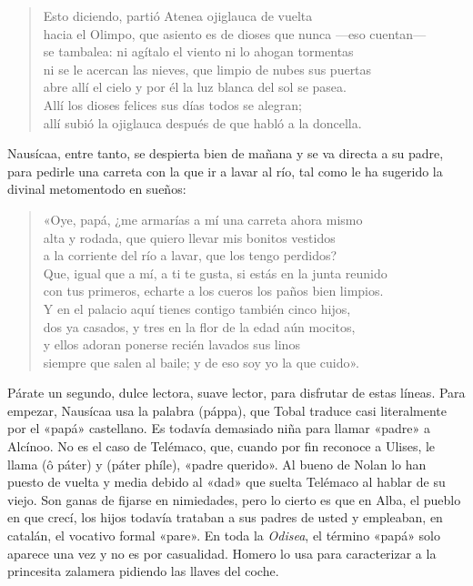 \begin{verse}
Esto diciendo, partió Atenea ojiglauca de vuelta\\
hacia el Olimpo, que asiento es de dioses que nunca ---eso cuentan---\\
se tambalea: ni agítalo el viento ni lo ahogan tormentas\\
ni se le acercan las nieves, que limpio de nubes sus puertas\\
abre allí el cielo y por él la luz blanca del sol se pasea.\\
Allí los dioses felices sus días todos se alegran;\\
allí subió la ojiglauca después de que habló a la doncella.
\end{verse}

Nausícaa, entre tanto, se despierta bien de mañana y se va directa a su padre, para pedirle una carreta con la que ir a lavar al río, tal como le ha sugerido la divinal metomentodo en sueños:

\begin{verse}
«Oye, papá, ¿me armarías a mí una carreta ahora mismo\\
alta y rodada, que quiero llevar mis bonitos vestidos\\
a la corriente del río a lavar, que los tengo perdidos?\\
Que, igual que a mí, a ti te gusta, si estás en la junta reunido\\
con tus primeros, echarte a los cueros los paños bien limpios.\\
Y en el palacio aquí tienes contigo también cinco hijos,\\
dos ya casados, y tres en la flor de la edad aún mocitos,\\
y ellos adoran ponerse recién lavados sus linos\\
siempre que salen al baile; y de eso soy yo la que cuido».
\end{verse}

Párate un segundo, dulce lectora, suave lector, para disfrutar de estas líneas. Para empezar, Nausícaa usa la palabra  (páppa), que Tobal traduce casi literalmente por el «papá» castellano. Es todavía demasiado niña para llamar «padre» a Alcínoo. No es el caso de Telémaco, que, cuando por fin reconoce a Ulises, le llama  (ô páter) y  (páter phíle), «padre querido». Al bueno de Nolan lo han puesto de vuelta y media debido al «dad» que suelta Telémaco al hablar de su viejo. Son ganas de fijarse en nimiedades, pero lo cierto es que en Alba, el pueblo en que crecí, los hijos todavía trataban a sus padres de usted y empleaban, en catalán, el vocativo formal «pare». En toda la \emph{Odisea}, el término «papá» solo aparece una vez y no es por casualidad. Homero lo usa para caracterizar a la princesita zalamera pidiendo las llaves del coche.


